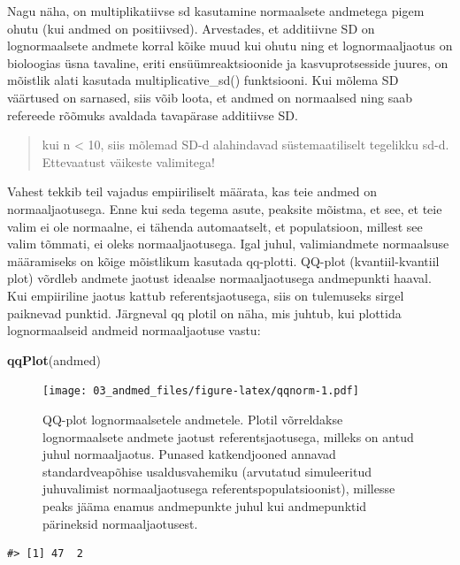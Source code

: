 \documentclass[]{book}
\newenvironment{Shaded}{\begin{snugshade}}{\end{snugshade}}
\newcommand{\KeywordTok}[1]{\textcolor[rgb]{0.13,0.29,0.53}{\textbf{#1}}}
\newcommand{\NormalTok}[1]{#1}
\begin{document}
Nagu näha, on multiplikatiivse sd kasutamine normaalsete andmetega pigem ohutu (kui andmed on positiivsed). Arvestades, et additiivne SD on lognormaalsete andmete korral kõike muud kui ohutu ning et lognormaaljaotus on bioloogias üsna tavaline, eriti ensüümreaktsioonide ja kasvuprotsesside juures, on mõistlik alati kasutada multiplicative\_sd() funktsiooni. Kui mõlema SD väärtused on sarnased, siis võib loota, et andmed on normaalsed ning saab refereede rõõmuks avaldada tavapärase additiivse SD.

\begin{quote}
kui n \textless{} 10, siis mõlemad SD-d alahindavad süstemaatiliselt tegelikku sd-d. Ettevaatust väikeste valimitega!
\end{quote}

Vahest tekkib teil vajadus empiiriliselt määrata, kas teie andmed on normaaljaotusega.
Enne kui seda tegema asute, peaksite mõistma, et see, et teie valim ei ole normaalne, ei tähenda automaatselt, et populatsioon, millest see valim tõmmati, ei oleks normaaljaotusega.
Igal juhul, valimiandmete normaalsuse määramiseks on kõige mõistlikum kasutada qq-plotti.
QQ-plot (kvantiil-kvantiil plot) võrdleb andmete jaotust ideaalse normaaljaotusega andmepunkti haaval. Kui empiiriline jaotus kattub referentsjaotusega, siis on tulemuseks sirgel paiknevad punktid. Järgneval qq plotil on näha, mis juhtub, kui plottida lognormaalseid andmeid normaaljaotuse vastu:



\begin{Shaded}
\begin{Highlighting}[]
\KeywordTok{qqPlot}\NormalTok{(andmed)}
\end{Highlighting}
\end{Shaded}

\begin{figure}
\centering
\texttt{[image: 03\_andmed\_files/figure-latex/qqnorm-1.pdf]}
\caption{\label{fig:qqnorm}QQ-plot lognormaalsetele andmetele. Plotil võrreldakse lognormaalsete andmete jaotust referentsjaotusega, milleks on antud juhul normaaljaotus. Punased katkendjooned annavad standardveapõhise usaldusvahemiku (arvutatud simuleeritud juhuvalimist normaaljaotusega referentspopulatsioonist), millesse peaks jääma enamus andmepunkte juhul kui andmepunktid pärineksid normaaljaotusest.}
\end{figure}

\begin{verbatim}
#> [1] 47  2
\end{verbatim}
\end{document}
